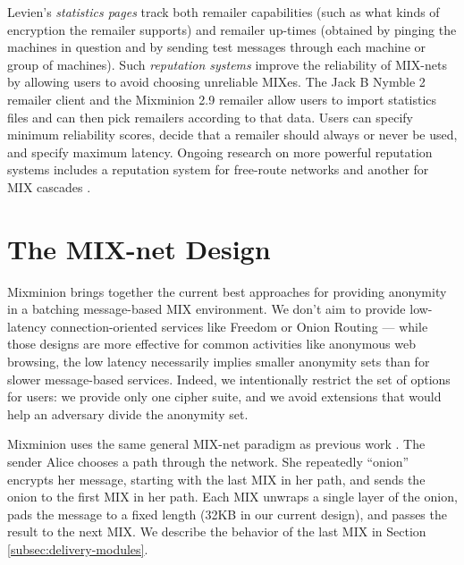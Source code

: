 \documentclass{llncs}
\begin{document}
Levien's \emph{statistics pages} \cite{levien} track both remailer
capabilities (such as what kinds of encryption the remailer supports)
and remailer up-times (obtained by pinging the machines in question
and by sending test messages through each machine or group of
machines).  Such \emph{reputation systems} improve the reliability of
MIX-nets by allowing users to avoid choosing unreliable MIXes. The
Jack B Nymble 2 remailer client \cite{potato} and the Mixminion 2.9
remailer allow users to import statistics files and can then pick
remailers according to that data. Users can specify minimum
reliability scores, decide that a remailer should always or never be
used, and specify maximum latency. Ongoing research on more powerful
reputation systems includes a reputation system for free-route
networks \cite{mix-acc} and another for MIX cascades \cite{casc-rep}.


\section{The MIX-net Design}
\label{sec:design}

Mixminion brings together the current best approaches for providing
anonymity in a batching message-based MIX environment. We don't aim
to provide low-latency connection-oriented services like Freedom
\cite{freedom} or Onion Routing \cite{goldschlag99} --- while those
designs are more effective for common activities like anonymous web
browsing, the low latency necessarily implies smaller anonymity sets
than for slower message-based services. Indeed, we intentionally
restrict the set of options for users: we provide only one
cipher suite, and we avoid extensions that would help an adversary
divide the anonymity set.

Mixminion uses the same general MIX-net paradigm as previous work
\cite{chaum-mix,mixmaster-attacks,babel}. The sender Alice chooses a
path through the network. She repeatedly ``onion'' encrypts her message,
starting with the last
MIX in her path, and sends the onion to the first MIX in her path. Each
MIX unwraps a single layer of the onion, pads the message to a fixed
length (32KB in our current design), and passes the result to the
next MIX. We describe the behavior of the last MIX in
Section \ref{subsec:delivery-modules}.

\end{document}
